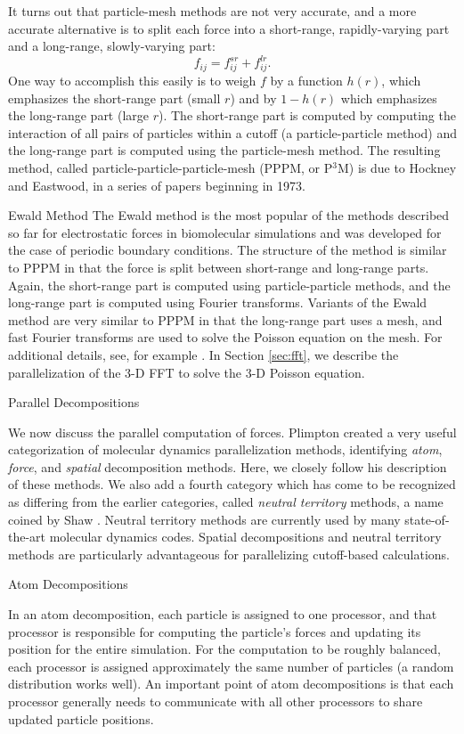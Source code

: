 It turns out that particle-mesh methods are not very accurate,
and a more accurate alternative is to split each force into a short-range,
rapidly-varying part and a long-range, slowly-varying part:
\[
f_{ij} = f_{ij}^{sr} + f_{ij}^{lr} .
\]
One way to accomplish this easily is to weigh $f$ by a function $h(r)$,
which emphasizes the short-range part (small $r$) and by $1-h(r)$ which
emphasizes the long-range part (large $r$).  The short-range part is
computed by computing the interaction of all pairs of particles
within a cutoff (a particle-particle method) and the long-range part
is computed using the particle-mesh method.  The resulting method,
called particle-particle-particle-mesh (PPPM, or P$^3$M) is due to
Hockney and Eastwood, in a series of papers beginning in 1973.

 {Ewald Method}  
The Ewald method is the most popular of the methods
described so far for electrostatic forces in biomolecular simulations and
was developed for the case of periodic boundary conditions.  The structure
of the method is similar to PPPM in that the force is split
between short-range and long-range parts.  Again, the short-range part is
computed using particle-particle methods, and the long-range part is
computed using Fourier transforms.  Variants of the Ewald method are
very similar to PPPM in that the long-range part uses a mesh, and fast
Fourier transforms are used to solve the Poisson equation on the mesh.
For additional details, see, for example \cite{frenkel-smit}.  
In Section \ref{sec:fft}, we describe the
parallelization of the 3-D FFT to solve the 3-D Poisson equation.

 {Parallel Decompositions}

We now discuss the parallel computation of forces.  Plimpton
\cite{plimpton} created a very useful categorization of molecular dynamics
parallelization methods, identifying {\em atom}, {\em force}, and {\em spatial} 
decomposition
methods.  Here, we closely follow his description of these methods.
We also add a fourth category which has come to be recognized as
differing from the earlier categories, called {\em neutral territory} methods,
a name coined by Shaw \cite{shaw}.  Neutral territory methods are currently
used by many state-of-the-art molecular dynamics codes.
Spatial decompositions and neutral territory methods are particularly
advantageous for parallelizing cutoff-based calculations.

 {Atom Decompositions}

In an atom decomposition, each particle is assigned to one processor,
and that processor is responsible for computing the particle's forces and
updating its position for the entire simulation.  For the computation
to be roughly balanced, each processor is assigned approximately the same
number of particles (a random distribution works well).  An important point
of atom decompositions is that each
processor generally needs to communicate with all other processors to
share updated particle positions.

